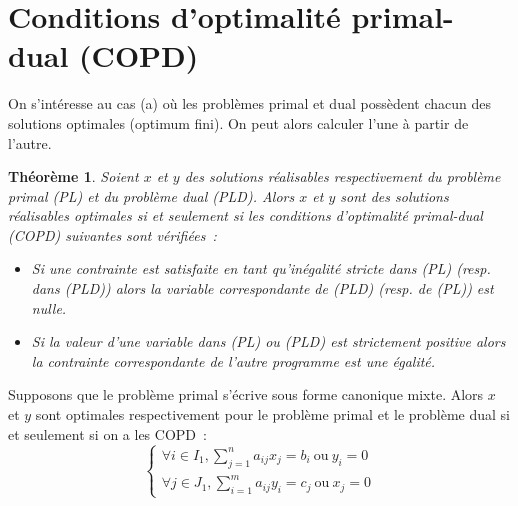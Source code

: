 \documentclass[a4paper,12pt,openany]{book}
\theoremstyle{plain}
\newtheorem{theorem}{Théorème}[section]
\theoremstyle{definition}
\theoremstyle{remark}
\theoremstyle{nbstyle}
\begin{document}
	
	
	\section{Conditions d'optimalité primal-dual (COPD)}
	
	On s'intéresse au cas (a) où les problèmes primal et dual possèdent chacun des solutions optimales (optimum fini). On peut alors calculer l'une à partir de l'autre.
	
	\begin{theorem}\label{theo4.4}
		Soient $x$ et $y$ des solutions réalisables respectivement du problème primal (PL) et du problème dual (PLD). Alors $x$ et $y$ sont des solutions réalisables optimales si et seulement si les conditions d'optimalité primal-dual (COPD) suivantes sont vérifiées~:
		\begin{itemize}
			\item Si une contrainte est satisfaite en tant qu'inégalité stricte dans (PL) (resp. dans (PLD)) alors la variable correspondante de (PLD) (resp. de (PL)) est nulle.
			\item Si la valeur d'une variable dans (PL) ou (PLD) est strictement positive alors la contrainte correspondante de l'autre programme est une égalité.
		\end{itemize}
	\end{theorem}
	
	Supposons que le problème primal s'écrive sous forme canonique mixte. Alors $x$ et $y$ sont optimales respectivement pour le problème primal et le problème dual si et seulement si on a les COPD~:
	\[
	\left\{
	\begin{array}{l}
	\forall i \in I_{1}, \displaystyle\sum_{j=1}^{n} a_{ij} x_{j} = b_{i} \ \text{ou} \ y_{i} = 0 \\
	\forall j \in J_{1}, \displaystyle\sum_{i=1}^{m} a_{ij} y_{i} = c_{j} \ \text{ou} \ x_{j} = 0
	\end{array}
	\right.
	\]
	
\end{document}
